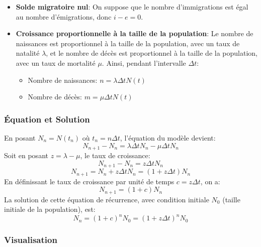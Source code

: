 \documentclass{article}
\begin{document}
\begin{itemize}
    \item \textbf{Solde migratoire nul}: On suppose que le nombre d'immigrations est égal au nombre d'émigrations, donc $i - e = 0$.
    \item \textbf{Croissance proportionnelle à la taille de la population}: Le nombre de naissances est proportionnel à la taille de la population, avec un taux de natalité $\lambda$, et le nombre de décès est proportionnel à la taille de la population, avec un taux de mortalité $\mu$. Ainsi, pendant l'intervalle $\Delta t$:
    \begin{itemize}
        \item Nombre de naissances: $n = \lambda \Delta t N(t)$
        \item Nombre de décès: $m = \mu \Delta t N(t)$
    \end{itemize}
\end{itemize}

\subsubsection{Équation et Solution}

En posant $N_n = N(t_n)$ où $t_n = n \Delta t$, l'équation du modèle devient:
\[
N_{n+1} - N_n = \lambda \Delta t N_n - \mu \Delta t N_n
\]
Soit en posant $z = \lambda - \mu$, le taux de croissance:
\[
N_{n+1} - N_n = z \Delta t N_n
\]
\[
N_{n+1} = N_n + z \Delta t N_n = (1 + z \Delta t) N_n
\]
En définissant le taux de croissance par unité de temps $c = z \Delta t$, on a:
\[
N_{n+1} = (1 + c) N_n
\]
La solution de cette équation de récurrence, avec condition initiale $N_0$ (taille initiale de la population), est:
\[
N_n = (1 + c)^n N_0 = (1 + z \Delta t)^n N_0
\]

\subsubsection{Visualisation}
\end{document}
